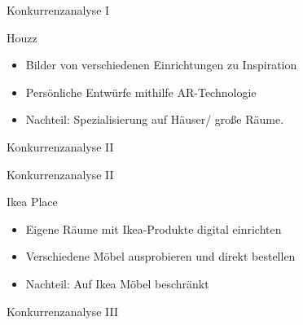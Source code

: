 \documentclass[presentation,bigger,aspectratio=169]{beamer}
\begin{document}
\begin{frame}[label={sec:org2502863}]{Konkurrenzanalyse I}
\begin{block}{Houzz}
\begin{itemize}
\item Bilder von verschiedenen Einrichtungen zu Inspiration
\item Persönliche Entwürfe mithilfe AR-Technologie
\item Nachteil: Spezialisierung auf Häuser/ große Räume.
\end{itemize}
\end{block}
\end{frame}
\begin{frame}[label={sec:org3071872}]{Konkurrenzanalyse II}
\end{frame}
\begin{frame}[label={sec:org026f520}]{Konkurrenzanalyse II}
\begin{block}{Ikea Place}
\begin{itemize}
\item Eigene Räume mit Ikea-Produkte digital einrichten
\item Verschiedene Möbel ausprobieren und direkt bestellen
\item Nachteil: Auf Ikea Möbel beschränkt
\end{itemize}
\end{block}
\end{frame}
\begin{frame}[label={sec:orgd6d5dd4}]{Konkurrenzanalyse III}
\end{frame}
\end{document}
